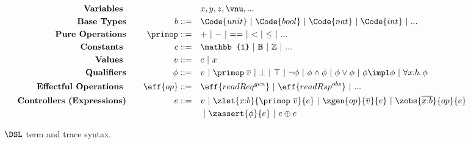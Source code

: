 \begin{figure}[t!]
  \vspace{-.3cm}
{\small
  \begin{alignat*}{2}
    \text{\textbf{Variables }}& \quad &\quad& x, y, z, \vnu, ...
    \\\text{\textbf{Base Types}}& \quad & b  ::= \quad &  \Code{unit} ~|~ \Code{bool} ~|~ \Code{nat} ~|~ \Code{int} ~|~ ... 
    \\\text{\textbf{Pure Operations}}& \quad & \primop ::= \quad & {+} ~|~ {-} ~|~ {==} ~|~ {<} ~|~ {\leq} ~|~ ...
    \\ \text{\textbf{Constants }}& \quad &c ::= \quad & \mathbb{1} ~|~ \mathbb{B} ~|~ \mathbb{Z} ~|~ ...
    \\ \text{\textbf{Values }}& \quad  & v ::= \quad & c ~|~ x
    \\ \text{\textbf{Qualifiers}}& \quad & \phi ::= \quad & v ~|~ \primop\;\overline{v} ~|~ \bot ~|~ \top  ~|~ \neg \phi ~|~ \phi \land \phi ~|~ \phi \lor \phi ~|~ \phi \impl \phi ~|~ \forall x{:}b.\, \phi
    \\\text{\textbf{Effectful Operations }}& \quad & \eff{op} ::= \quad & \eff{readReq^{gen}} ~|~ \eff{readRsp^{obs}} ~|~  ...
    \\ \text{\textbf{Controllers (Expressions)}}& \quad & e ::=\quad & v ~|~ \zlet{x{:}b}{\primop\ \overline{v}}{e} ~|~ \zgen{op}{\overline{v}}{e} ~|~ \zobs{\overline{x{:}b}}{op}{e} 
    \\ & & \quad & ~|~  \zassert{\phi}{e} ~|~ e \oplus e
  \end{alignat*}}
\caption{$\DSL$ term and trace syntax. }
\label{fig:term-syntax}
\end{figure}